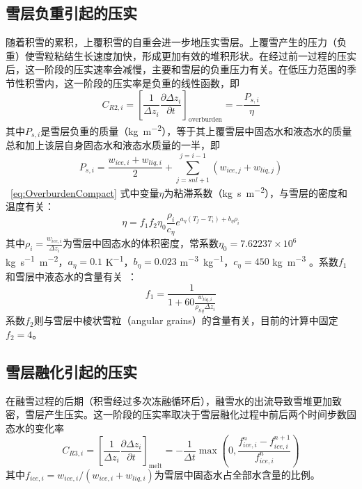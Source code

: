 \subsection{雪层负重引起的压实}
随着积雪的累积，上覆积雪的自重会进一步地压实雪层。上覆雪产生的压力（负重）使雪粒粘结生长速度加快，形成更加有效的堆积形状。在经过前一过程的压实后，这一阶段的压实速率会减慢，主要和雪层的负重压力有关。在低压力范围的季节性积雪内，这一阶段的压实率是负重的线性函数\citep{anderson1976point}，即
\begin{equation}\label{eq:OverburdenCompact}
C_{R2,i}=\left[\frac{1}{\Delta {z_i}} \frac{\partial \Delta {z_i}}{\partial {t}}\right]_{\text {overburden}}=-\frac{P_{s,i}}{\eta}
\end{equation}
其中$P_{s,i}$是雪层负重的质量（\unit{kg.m^{-2}}），等于其上覆雪层中固态水和液态水的质量总和加上该层自身固态水和液态水质量的一半，即
\begin{equation}
P_{s,i}=\frac{w_{ice,i}+w_{liq,i}}{2}+\sum_{{j}={snl}+1}^{{j}={i}-1}\left({w}_{ice,j}+{w}_{liq,j}\right)
\end{equation}
~\eqref{eq:OverburdenCompact} 式中变量$\eta$为粘滞系数（\unit{kg.s.m^{-2}}），与雪层的密度和温度有关：
\begin{equation}
    \eta=f_1 f_2 \eta_0 \frac{\rho_i}{c_\eta} e^{a_\eta \left(T_f-T_i\right)+b_\eta \rho_i}
\end{equation}
其中$\rho_i=\frac{w_{ice,i}}{\Delta z_i}$为雪层中固态水的体积密度，常系数$\eta_0=7.62237 \times 10^6$ \unit{kg.s^{-1}.m^{-2}}，$a_\eta=0.1$ \unit{K^{-1}}，$b_\eta=0.023$ \unit{m^{-3}.kg^{-1}}，$c_\eta=450$ \unit{kg.m^{-3}} \citep{Kampenhout2017}。系数$f_1$和雪层中液态水的含量有关~\citep{Vionnet2012}：
\begin{equation}
    f_1=\frac{1}{1+60\frac{w_{liq,i}}{\rho_{liq}\Delta z_i}}
\end{equation}
系数$f_2$则与雪层中棱状雪粒（angular grains）的含量有关，目前的计算中固定$f_2=4$。

\subsection{雪层融化引起的压实}
在融雪过程的后期（积雪经过多次冻融循环后），融雪水的出流导致雪堆更加致密，雪层产生压实。这一阶段的压实率取决于雪层融化过程中前后两个时间步数固态水的变化率
\begin{equation}
C_{R3,i}=\left[\frac{1}{\Delta {z_i}} \frac{\partial \Delta {z_i}}{\partial {t}}\right]_{\text{melt}}=-\frac{1}{\Delta {t}}\max\left(0,\frac{{f}_{{ice,i}}^{n}-{f}_{{ice,i}}^{n+1}}{{f}_{ice,i}^{n}}\right)
\end{equation}
其中$f_{ice,i}=w_{ice,i}/\left({w_{ice,i}+w_{liq,i}}\right)$为雪层中固态水占全部水含量的比例。

